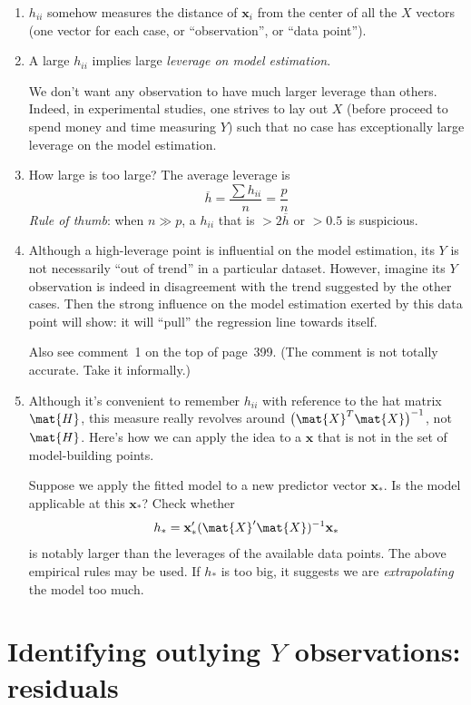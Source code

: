 \documentclass[12pt]{article}
\renewcommand\vec[1]{\ensuremath{\mathbf{#1}}}
\begin{document}
\begin{enumerate}
\item
$h_{ii}$ somehow measures the distance of
$\vec{x}_i$
from the center of all the $X$ vectors (one vector for each case,
or ``observation'', or ``data point'').

\item
A large $h_{ii}$ implies large \emph{leverage on
model estimation}.

We don't want any observation to have much larger leverage than others.
Indeed, in experimental studies,
one strives to lay out $X$ (before proceed to spend money and time
measuring $Y$) such that no case has exceptionally large leverage
on the model estimation.

\item
How large is too large?
The average leverage is
\[
\overline{h} = \frac{\sum h_{ii}}{n} = \frac{p}{n}
\]
\emph{Rule of thumb}:
when $n \gg p$,
a $h_{ii}$ that is $> 2\overline{h}$ or $> 0.5$ is suspicious.

\item
Although a high-leverage point is influential on the model estimation,
its $Y$ is not necessarily ``out of trend'' in a particular dataset.
However,
imagine its $Y$ observation is indeed in disagreement with the trend
suggested by the other cases.
Then the strong influence on the model estimation exerted by this data
point will show: it will ``pull'' the regression line towards itself.

Also see comment~1 on the top of page~399.
(The comment is not totally accurate. Take it informally.)

\item
Although it's convenient to remember $h_{ii}$
with reference to the hat matrix $\mat{H}$,
this measure really revolves around $\bigl(\mat{X}^T\mat{X}\bigr)^{-1}$,
not $\mat{H}$.
Here's how we can apply the idea to a $\vec{x}$ that is not in the
set of model-building points.

Suppose we apply the fitted model to a new predictor vector
$\vec{x}_*$.
Is the model applicable at this $\vec{x}_*$?
Check whether
\[
h_* = \vec{x}_*' (\mat{X}'\mat{X})^{-1} \vec{x}_*
\]
is notably larger than the leverages of the available data points.
The above empirical rules may be used.
If $h_*$ is too big,
it suggests we are \emph{extrapolating} the model too much.
\end{enumerate}

\section{Identifying outlying $Y$ observations:\\ residuals}
\end{document}
